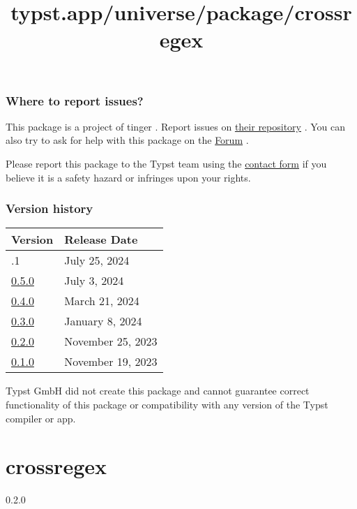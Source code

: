 \subsubsection{Where to report issues?}\label{where-to-report-issues}

This package is a project of tinger . Report issues on
\href{https://github.com/tingerrr/hydra}{their repository} . You can
also try to ask for help with this package on the
\href{https://forum.typst.app}{Forum} .

Please report this package to the Typst team using the
\href{https://typst.app/contact}{contact form} if you believe it is a
safety hazard or infringes upon your rights.

\label{versions}
\subsubsection{Version history}\label{version-history}

\begin{longtable}[]{@{}ll@{}}
\toprule\noalign{}
Version & Release Date \\
\midrule\noalign{}
\endhead
\bottomrule\noalign{}
\endlastfoot
0.5.1 & July 25, 2024 \\
\href{https://typst.app/universe/package/hydra/0.5.0/}{0.5.0} & July 3,
2024 \\
\href{https://typst.app/universe/package/hydra/0.4.0/}{0.4.0} & March
21, 2024 \\
\href{https://typst.app/universe/package/hydra/0.3.0/}{0.3.0} & January
8, 2024 \\
\href{https://typst.app/universe/package/hydra/0.2.0/}{0.2.0} & November
25, 2023 \\
\href{https://typst.app/universe/package/hydra/0.1.0/}{0.1.0} & November
19, 2023 \\
\end{longtable}

Typst GmbH did not create this package and cannot guarantee correct
functionality of this package or compatibility with any version of the
Typst compiler or app.


\title{typst.app/universe/package/crossregex}

\label{banner}
\section{crossregex}\label{crossregex}

{ 0.2.0 }

